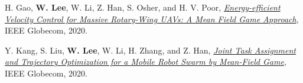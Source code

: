 \begin{cvparagraph}
\begin{cvitems}
    \medskip
    \item H. Gao, \textbf{W. Lee}, W. Li, Z. Han, S. Osher, and H. V. Poor, \href{ftp://ftp.math.ucla.edu/pub/camreport/cam19-57.pdf}{\textit{Energy-efficient Velocity Control for Massive Rotary-Wing UAVs: A Mean Field Game Approach}}, {IEEE Globecom}, 2020.
    \medskip
    \item Y. Kang, S. Liu, \textbf{W. Lee}, W. Li, H. Zhang, and Z. Han, \href{https://ieeexplore.ieee.org/document/9322422}{\textit{Joint Task Assignment and Trajectory Optimization for a Mobile Robot Swarm by Mean-Field Game}}, {IEEE Globecom}, 2020.
  \end{cvitems}

\vspace{0.5cm}
\end{cvparagraph}